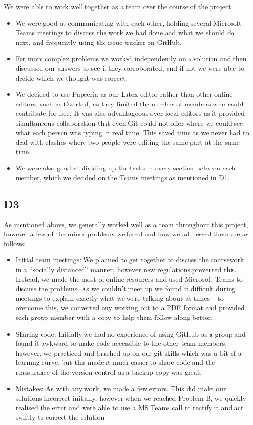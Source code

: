 \documentclass[a4paper,10pt,reqno]{amsart}
\numberwithin{equation}{section}
\begin{document}
We were able to work well together as a team over the course of the project.
\begin{itemize}
     \item We were good at communicating with each other, holding several Microsoft Teams meetings to discuss the work we had done and what we should do next, and frequently using the issue tracker on GitHub.
     \item For more complex problems we worked independently on a solution and then discussed our answers to see if they corroborated, and if not we were able to decide which we thought was correct. 
     \item We decided to use Papeeria as our Latex editor rather than other online editors, such as Overleaf, as they limited the number of members who could contribute for free. It was also advantageous over local editors as it provided simultaneous collaboration that even Git could not offer where we could see what each person was typing in real time. This saved time as we never had to deal with clashes where two people were editing the same part at the same time. 
     \item We were also good at dividing up the tasks in every section between each member, which we decided on the Teams meetings as mentioned in D1.
\end{itemize}


\subsection{D3}\label{sec:d3}
As mentioned above, we generally worked well as a team throughout this project, however a few of the minor problems we faced and how we addressed them are as follows:
\begin{itemize}
  \item Initial team meetings: We planned to get together to discuss the coursework in a ``socially distanced'' manner, however new regulations prevented this. Instead, we made the most of online resources and used Microsoft Teams to discuss the problems. As we couldn't meet up we found it difficult during meetings to explain exactly what we were talking about at times – to overcome this, we converted any working out to a PDF format and provided each group member with a copy to help them follow along better.
  \item Sharing code: Initially we had no experience of using GitHub as a group and found it awkward to make code accessible to the other team members, however, we practiced and brushed up on our git skills which was a bit of a learning curve, but this made it much easier to share code and the reassurance of the version control as a backup copy was great.
  \item Mistakes: As with any work, we made a few errors. This did make our solutions incorrect initially, however when we reached Problem B, we quickly realised the error and were able to use a MS Teams call to rectify it and act swiftly to correct the solution.
\end{itemize}
\end{document}
